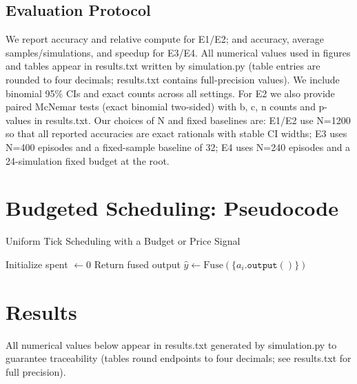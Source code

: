 \subsection{Evaluation Protocol}
We report accuracy and relative compute for E1/E2; and accuracy, average samples/simulations, and speedup for E3/E4. All numerical values used in figures and tables appear in results.txt written by simulation.py (table entries are rounded to four decimals; results.txt contains full-precision values). We include binomial 95\% CIs and exact counts across all settings. For E2 we also provide paired McNemar tests (exact binomial two-sided) with b, c, n counts and p-values in results.txt. Our choices of N and fixed baselines are: E1/E2 use N=1200 so that all reported accuracies are exact rationals with stable CI widths; E3 uses N=400 episodes and a fixed-sample baseline of 32; E4 uses N=240 episodes and a 24-simulation fixed budget at the root.

\section{Budgeted Scheduling: Pseudocode}
\label{sec:algo}
\begin{adjustbox}{width=\linewidth}
\begin{minipage}{\linewidth}
\begin{algorithm}[H]
\DontPrintSemicolon
\caption{Uniform Tick Scheduling with a Budget or Price Signal}
Initialize spent $\leftarrow 0$\;
Return fused output $\hat{y} \leftarrow \text{Fuse}(\{a_i.\texttt{output}()\})$\;
\end{algorithm}
\end{minipage}
\end{adjustbox}

\section{Results}
\label{sec:results}
All numerical values below appear in results.txt generated by simulation.py to guarantee traceability (tables round endpoints to four decimals; see results.txt for full precision).

